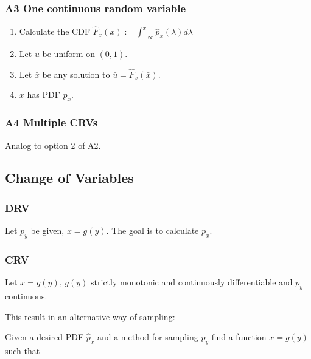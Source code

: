 \documentclass[10pt,a4paper]{scrartcl}
\begin{document}
\begin{multicols*}{2}
\subsubsection{A3 One continuous random variable}

\begin{enumerate}
\item Calculate the CDF $\hat{F}_x(\bar{x}):=\int_{-\infty}^{\bar{x}}\hat{p}_x(\lambda)d\lambda$
\item Let $u$ be uniform on $(0,1)$.
\item Let $\bar{x}$ be any solution to $\bar{u}=\hat{F}_x(\bar{x})$.
\item $x$ has PDF $\hat{p}_x$.
\end{enumerate}

\subsubsection{A4 Multiple CRVs}

Analog to option 2 of A2.

\subsection{Change of Variables}

\subsubsection{DRV}

Let $p_y$ be given, $x = g(y)$. The goal is to calculate $p_x$.


\subsubsection{CRV}

Let $x=g(y)$, $g(y)$ strictly monotonic and continuously differentiable and $p_y$ continuous.


This result in an alternative way of sampling:

Given a desired PDF $\hat{p}_x$ and a method for sampling $p_y$ find a function $x=g(y)$ such that



\end{multicols*}
\end{document}
